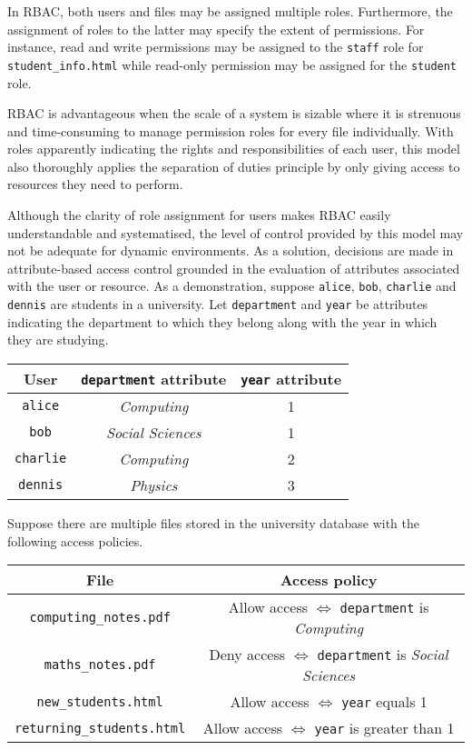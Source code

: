 \documentclass{article}
\begin{document}
In RBAC, both users and files may be assigned multiple roles. Furthermore, the assignment of roles to the latter may specify the extent of permissions. For instance, read and write permissions may be assigned to the \texttt{staff} role for \texttt{student\_info.html} while read-only permission may be assigned for the \texttt{student} role.

RBAC is advantageous when the scale of a system is sizable where it is strenuous and time-consuming to manage permission roles for every file individually. With roles apparently indicating the rights and responsibilities of each user, this model also thoroughly applies the separation of duties principle\cite{principles} by only giving access to resources they need to perform.

Although the clarity of role assignment for users makes RBAC easily understandable and systematised, the level of control provided by this model may not be adequate for dynamic environments. As a solution, decisions are made in attribute-based access control grounded in the evaluation of attributes associated with the user or resource.\cite{models} As a demonstration, suppose \texttt{alice}, \texttt{bob}, \texttt{charlie} and \texttt{dennis} are students in a university. Let \texttt{department} and \texttt{year} be attributes indicating the department to which they belong along with the year in which they are studying.

\begin{center}
\begin{tabular}{c|cc}
    User & \texttt{department} attribute & \texttt{year} attribute\\
    \hline
    \texttt{alice} & \textit{Computing} & 1\\
    \texttt{bob} & \textit{Social Sciences} & 1\\
    \texttt{charlie} & \textit{Computing} & 2\\
    \texttt{dennis} & \textit{Physics} & 3\\
\end{tabular}
\end{center}

Suppose there are multiple files stored in the university database with the following access policies.

\begin{center}
\begin{tabular}{c|c}
    File & Access policy\\
    \hline
    \texttt{computing\_notes.pdf} & Allow access $\iff$ \texttt{department} is \textit{Computing}\\
    \texttt{maths\_notes.pdf} & Deny access $\iff$ \texttt{department} is \textit{Social Sciences}\\
    \texttt{new\_students.html} & Allow access $\iff$ \texttt{year} equals 1\\
    \texttt{returning\_students.html} & Allow access $\iff$ \texttt{year} is greater than 1
\end{tabular}
\end{center}
\end{document}

